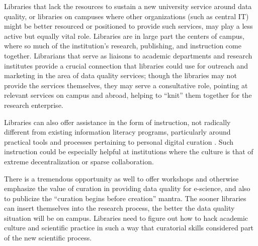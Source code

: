 \documentclass{acm_proc_article-sp}
\begin{document}
%

Libraries that lack the resources to sustain a new university service
around data quality, or libraries on campuses where other
organizations (such as central IT) might be better resourced or
positioned to provide such services, may play a less active but
equally vital role. Libraries are in large part the centers of campus,
where so much of the institution's research, publishing, and
instruction come together. Librarians that serve as liaisons to
academic departments and research institutes provide a crucial
connection that libraries could use for outreach and marketing in the
area of data quality services; though the libraries may not provide
the services themselves, they may serve a consultative role, pointing
at relevant services on campus and abroad, helping to ``knit'' them
together for the research enterprise.

Libraries can also offer assistance in the form of instruction, not
radically different from existing information literacy programs,
particularly around practical tools and processes pertaining to
personal digital curation \cite{williams:lifecycle}. Such instruction
could be especially helpful at institutions where the culture is that
of extreme decentralization or sparse collaboration.

There is a tremendous opportunity as well to offer workshops and
otherwise emphasize the value of curation in providing data quality
for e-science, and also to publicize the ``curation begins before
creation'' mantra. The sooner libraries can insert themselves into the
research process, the better the data quality situation will be on
campus. Libraries need to figure out how to hack academic culture and
scientific practice in such a way that curatorial skills considered
part of the new scientific process.
\end{document}
